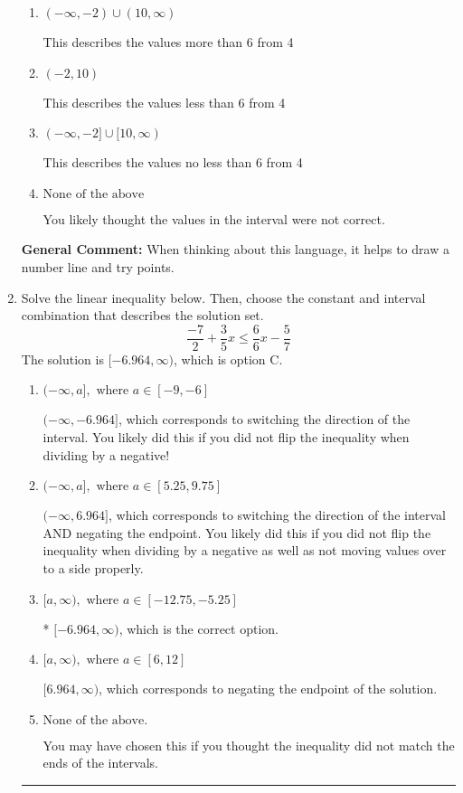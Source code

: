\documentclass{extbook}[14pt]
\newcommand{\litem}[1]{\item #1

\rule{\textwidth}{0.4pt}}
\begin{document}
\begin{enumerate}
{\begin{enumerate}[label=\Alph*.]
This describes the values no more than 6 from 4
\item \( (-\infty, -2) \cup (10, \infty) \)

This describes the values more than 6 from 4
\item \( (-2, 10) \)

This describes the values less than 6 from 4
\item \( (-\infty, -2] \cup [10, \infty) \)

This describes the values no less than 6 from 4
\item \( \text{None of the above} \)

You likely thought the values in the interval were not correct.
\end{enumerate}

\textbf{General Comment:} When thinking about this language, it helps to draw a number line and try points.
}
\litem{
Solve the linear inequality below. Then, choose the constant and interval combination that describes the solution set.
\[ \frac{-7}{2} + \frac{3}{5} x \leq \frac{6}{6} x - \frac{5}{7} \]The solution is \( [-6.964, \infty) \), which is option C.\begin{enumerate}[label=\Alph*.]
\item \( (-\infty, a], \text{ where } a \in [-9, -6] \)

 $(-\infty, -6.964]$, which corresponds to switching the direction of the interval. You likely did this if you did not flip the inequality when dividing by a negative!
\item \( (-\infty, a], \text{ where } a \in [5.25, 9.75] \)

 $(-\infty, 6.964]$, which corresponds to switching the direction of the interval AND negating the endpoint. You likely did this if you did not flip the inequality when dividing by a negative as well as not moving values over to a side properly.
\item \( [a, \infty), \text{ where } a \in [-12.75, -5.25] \)

* $[-6.964, \infty)$, which is the correct option.
\item \( [a, \infty), \text{ where } a \in [6, 12] \)

 $[6.964, \infty)$, which corresponds to negating the endpoint of the solution.
\item \( \text{None of the above}. \)

You may have chosen this if you thought the inequality did not match the ends of the intervals.
\end{enumerate}

}
\end{enumerate}
\end{document}
